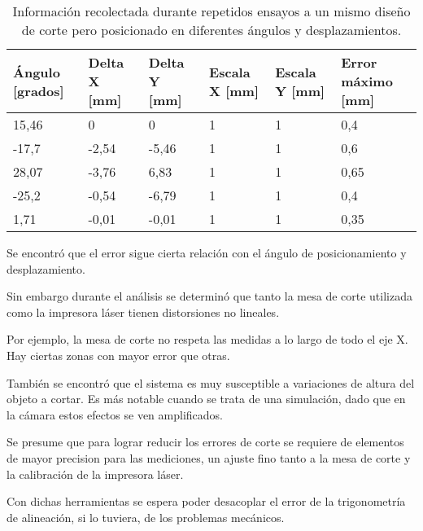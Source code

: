       \begin{table}[!ht]
         \centering
         \caption[Ensayos de corte simulado.]{Información recolectada durante repetidos ensayos a un mismo diseño de corte pero posicionado en diferentes ángulos y desplazamientos.}
         \begin{tabular}[!ht]{m{1.6cm}m{1.6cm}m{1.6cm}m{1.6cm}m{1.6cm}m{1.6cm}}
            \toprule
            \textbf{Ángulo [grados]} & \textbf{Delta X [mm]} & \textbf{Delta Y [mm]} & \textbf{Escala X [mm]} & \textbf{Escala Y [mm]} & \textbf{Error máximo [mm]}\\
            \midrule
            15,46 & 0     & 0     & 1 & 1 & 0,4\\
            -17,7 & -2,54 & -5,46 & 1 & 1 & 0,6\\
            28,07 & -3,76 & 6,83  & 1 & 1 & 0,65\\
            -25,2 & -0,54 & -6,79 & 1 & 1 & 0,4\\
            1,71  & -0,01 & -0,01 & 1 & 1 & 0,35\\
            \bottomrule
         \end{tabular}
         \label{tbl:ensayo_A}
      \end{table}

         Se encontró que el error sigue cierta relación con el ángulo de posicionamiento y desplazamiento.\par
      Sin embargo durante el análisis se determinó que tanto la mesa de corte utilizada como la impresora láser tienen distorsiones no lineales.\par
      Por ejemplo, la mesa de corte no respeta las medidas a lo largo de todo el eje X. Hay ciertas zonas con mayor error que otras.\par

      También se encontró que el sistema es muy susceptible a variaciones de altura del objeto a cortar. Es más notable cuando se trata de una simulación, dado que en la cámara estos efectos se ven amplificados.\par

      Se presume que para lograr reducir los errores de corte se requiere de elementos de mayor precision para las mediciones, un ajuste fino tanto a la mesa de corte y la calibración de la impresora láser.\par

   Con dichas herramientas se espera poder desacoplar el error de la trigonometría de alineación, si lo tuviera, de los problemas mecánicos. \par


